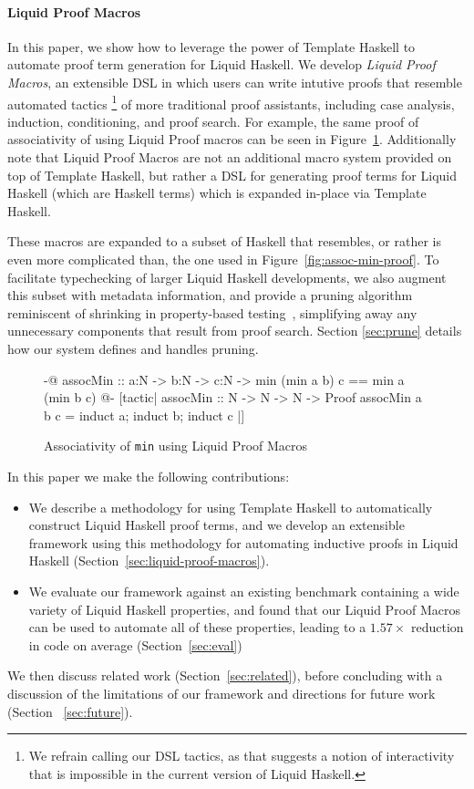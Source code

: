 \paragraph*{Liquid Proof Macros}

In this paper, we show how to leverage the power of Template Haskell
to automate proof term generation for Liquid Haskell.  We develop {\em
  Liquid Proof Macros}, an extensible DSL in which users can write
intutive proofs that resemble automated tactics%
\footnote{We refrain calling our DSL tactics, as that suggests a
  notion of interactivity that is impossible in the current version
  of Liquid Haskell.}%
%
 of more traditional proof assistants, including case analysis,
 induction, conditioning, and proof search. For example, the same
 proof of associativity of  using Liquid Proof macros can be
 seen in Figure~\ref{fig:assoc-min-macro}. Additionally note that Liquid Proof
 Macros are not an additional macro system provided on top of Template Haskell,
 but rather a DSL for generating proof terms for Liquid Haskell (which are
 Haskell terms) which is expanded in-place via Template Haskell.

These macros are expanded to a subset of Haskell that resembles, or
rather is even more complicated than, the one used in
Figure~\ref{fig:assoc-min-proof}. To facilitate typechecking of larger
Liquid Haskell developments, we also augment this subset with metadata
information, and provide a pruning algorithm reminiscent of shrinking
in property-based testing~\cite{ClaessenH00}, simplifying away any
unnecessary components that result from proof search. Section
\ref{sec:prune} details how our system defines and handles pruning.


\begin{figure}[t]
\begin{code}
  {-@ assocMin :: a:N -> b:N -> c:N ->
        {min (min a b) c == min a (min b c)} @-}
  [tactic|
    assocMin :: N -> N -> N -> Proof
    assocMin a b c = induct a; induct b; induct c
  |]
\end{code}
\caption{Associativity of \texttt{min} using Liquid Proof Macros}
\label{fig:assoc-min-macro}
\end{figure}

\pagebreak
In this paper we make the following contributions:
\begin{itemize}
\item We describe a methodology for using Template Haskell to
  automatically construct Liquid Haskell proof terms, and we develop
  an extensible framework using this methodology for automating
  inductive proofs in Liquid Haskell
  (Section~\ref{sec:liquid-proof-macros}).
\item We evaluate our framework against an existing benchmark
  containing a wide variety of Liquid Haskell properties, and found
  that our Liquid Proof Macros can be used to automate all of these
  properties, leading to a $1.57\times$ reduction in code on average
  (Section~\ref{sec:eval})
\end{itemize}
We then discuss related work (Section~\ref{sec:related}), before
concluding with a discussion of the limitations of our framework and
directions for future work (Section ~\ref{sec:future}).
